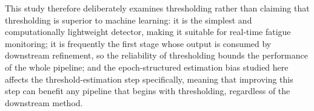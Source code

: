 This study therefore deliberately examines thresholding rather than claiming that thresholding is superior to machine learning: it is the simplest and computationally lightweight detector, making it suitable for real-time fatigue monitoring; it is frequently the first stage whose output is consumed by downstream refinement, so the reliability of thresholding bounds the performance of the whole pipeline; and the epoch-structured estimation bias studied here affects the threshold-estimation step specifically, meaning that improving this step can benefit any pipeline that begins with thresholding, regardless of the downstream method.
